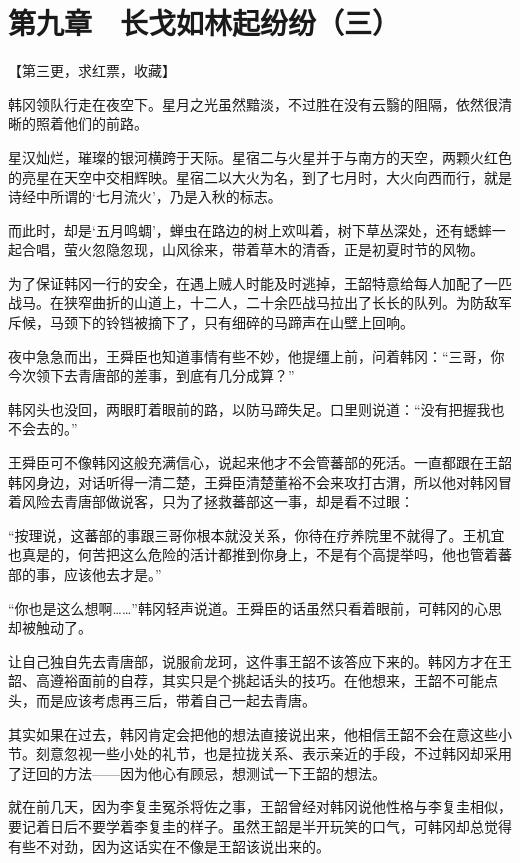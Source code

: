 \section{第九章　长戈如林起纷纷（三）}

【第三更，求红票，收藏】

韩冈领队行走在夜空下。星月之光虽然黯淡，不过胜在没有云翳的阻隔，依然很清晰的照着他们的前路。

星汉灿烂，璀璨的银河横跨于天际。星宿二与火星并于与南方的天空，两颗火红色的亮星在天空中交相辉映。星宿二以大火为名，到了七月时，大火向西而行，就是诗经中所谓的‘七月流火’，乃是入秋的标志。

而此时，却是‘五月鸣蜩’，蝉虫在路边的树上欢叫着，树下草丛深处，还有蟋蟀一起合唱，萤火忽隐忽现，山风徐来，带着草木的清香，正是初夏时节的风物。

为了保证韩冈一行的安全，在遇上贼人时能及时逃掉，王韶特意给每人加配了一匹战马。在狭窄曲折的山道上，十二人，二十余匹战马拉出了长长的队列。为防敌军斥候，马颈下的铃铛被摘下了，只有细碎的马蹄声在山壁上回响。

夜中急急而出，王舜臣也知道事情有些不妙，他提缰上前，问着韩冈：“三哥，你今次领下去青唐部的差事，到底有几分成算？”

韩冈头也没回，两眼盯着眼前的路，以防马蹄失足。口里则说道：“没有把握我也不会去的。”

王舜臣可不像韩冈这般充满信心，说起来他才不会管蕃部的死活。一直都跟在王韶韩冈身边，对话听得一清二楚，王舜臣清楚董裕不会来攻打古渭，所以他对韩冈冒着风险去青唐部做说客，只为了拯救蕃部这一事，却是看不过眼：

“按理说，这蕃部的事跟三哥你根本就没关系，你待在疗养院里不就得了。王机宜也真是的，何苦把这么危险的活计都推到你身上，不是有个高提举吗，他也管着蕃部的事，应该他去才是。”

“你也是这么想啊……”韩冈轻声说道。王舜臣的话虽然只看着眼前，可韩冈的心思却被触动了。

让自己独自先去青唐部，说服俞龙珂，这件事王韶不该答应下来的。韩冈方才在王韶、高遵裕面前的自荐，其实只是个挑起话头的技巧。在他想来，王韶不可能点头，而是应该考虑再三后，带着自己一起去青唐。

其实如果在过去，韩冈肯定会把他的想法直接说出来，他相信王韶不会在意这些小节。刻意忽视一些小处的礼节，也是拉拢关系、表示亲近的手段，不过韩冈却采用了迂回的方法——因为他心有顾忌，想测试一下王韶的想法。

就在前几天，因为李复圭冤杀将佐之事，王韶曾经对韩冈说他性格与李复圭相似，要记着日后不要学着李复圭的样子。虽然王韶是半开玩笑的口气，可韩冈却总觉得有些不对劲，因为这话实在不像是王韶该说出来的。

